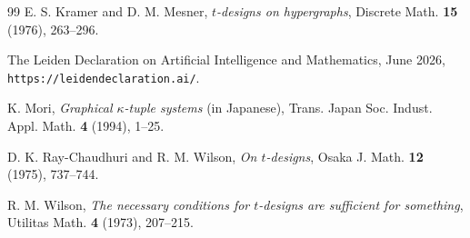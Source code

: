 \documentclass[12pt]{amsart}
\theoremstyle{definition}
\begin{document}
\begin{thebibliography}{99}
E. S. Kramer and D. M. Mesner, \emph{$t$-designs on hypergraphs}, Discrete
Math. \textbf{15} (1976), 263--296.

The Leiden Declaration on Artificial Intelligence and Mathematics, June
2026, \texttt{https://leidendeclaration.ai/}.

K. Mori, \emph{Graphical $\kappa$-tuple systems} (in Japanese), Trans. Japan
Soc. Indust. Appl. Math. \textbf{4} (1994), 1--25.

D. K. Ray-Chaudhuri and R. M. Wilson, \emph{On $t$-designs}, Osaka J. Math.
\textbf{12} (1975), 737--744.

R. M. Wilson, \emph{The necessary conditions for $t$-designs are sufficient
for something}, Utilitas Math. \textbf{4} (1973), 207--215.

\end{thebibliography}
\end{document}
